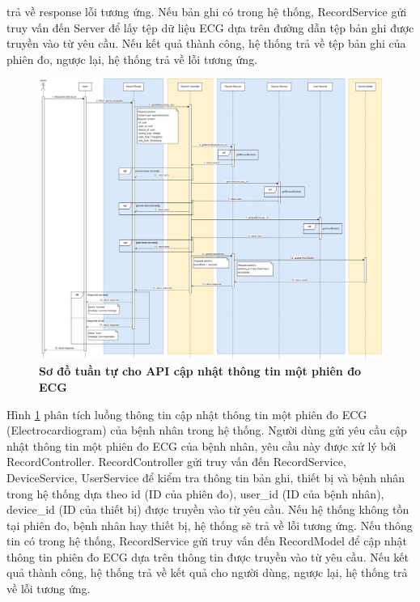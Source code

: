 trả về response lỗi tương ứng. Nếu bản ghi có trong hệ thống, RecordService gửi truy vấn đến Server để lấy tệp dữ liệu ECG dựa trên đường dẫn tệp bản ghi được truyền vào từ yêu cầu. 
Nếu kết quả thành công, hệ thống trả về tệp bản ghi của phiên đo, ngược lại, hệ thống trả về lỗi tương ứng.
 \begin{figure}[H]
  \centering
  \includegraphics[scale=0.25]{Images/sequence_api/editRecordById.png}
  \caption[Sơ đồ tuần tự cho API cập nhật thông tin một phiên đo ECG ]{\bfseries \fontsize{12pt}{0pt}
  \selectfont Sơ đồ tuần tự cho API cập nhật thông tin một phiên đo ECG }
  \label{api_editRecordById} %
\end{figure}
Hình \ref{api_editRecordById} phân tích luồng thông tin cập nhật thông tin một phiên đo ECG (Electrocardiogram) của bệnh nhân trong hệ thống. Người dùng gửi yêu cầu cập nhật thông tin một phiên đo ECG của bệnh nhân, 
yêu cầu này được xử lý bởi RecordController. RecordController gửi truy vấn đến RecordService, DeviceService, UserService để kiểm tra thông tin bản ghi, thiết bị và bệnh nhân trong hệ thống dựa theo id (ID của phiên đo), user\_id (ID của bệnh nhân), device\_id (ID của thiết bị)
 được truyền vào từ yêu cầu. Nếu hệ thống không tồn tại phiên đo, bệnh nhân hay thiết bị, hệ thống sẽ trả về lỗi tương ứng. Nếu thông tin có trong hệ thống, RecordService gửi truy vấn đến RecordModel để cập nhật thông tin
phiên đo ECG dựa trên thông tin được truyền vào từ yêu cầu. Nếu kết quả thành công, hệ thống trả về kết quả cho người dùng, ngược lại, hệ thống trả về lỗi tương ứng.

